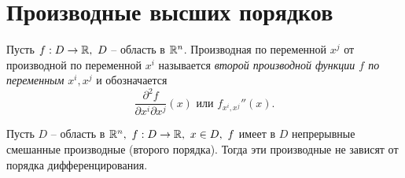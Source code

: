 

\section{Производные высших порядков}

\begin{definition}
    Пусть $ f:D \rightarrow\mathbb{R}, \ D $ -- область в $ \mathbb{R}^n $. Производная по переменной $ x^j $ от производной по переменной $ x^i $ называется \emph{второй производной функции $ f $ по переменным} $ x^i,x^j $ и обозначается
    \[
        \frac{\partial^2f}{\partial x^i\partial x^j}(x)\text{ или }f_{x^i,x^j}''(x).
    \]
\end{definition}

\begin{theorem}
    Пусть $ D $ -- область в $ \mathbb{R}^n, \ f: D \rightarrow\mathbb{R}, \ x \in D, \ f $ имеет в $ D $ непрерывные смешанные производные (второго порядка). Тогда эти производные не зависят от порядка дифференцирования.
\end{theorem}


